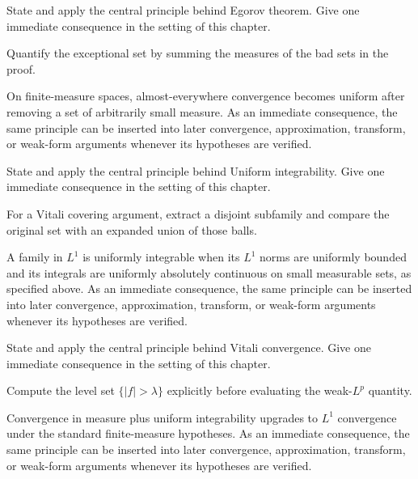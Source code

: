 \begin{exercise}\label{exr:iii08-02}
State and apply the central principle behind Egorov theorem. Give one immediate consequence in the setting of this chapter.
\end{exercise}
\begin{hint}
Quantify the exceptional set by summing the measures of the bad sets in the proof.
\end{hint}
\begin{solution}
On finite-measure spaces, almost-everywhere convergence becomes uniform after removing a set of arbitrarily small measure. As an immediate consequence, the same principle can be inserted into later convergence, approximation, transform, or weak-form arguments whenever its hypotheses are verified.
\end{solution}

\begin{exercise}\label{exr:iii08-03}
State and apply the central principle behind Uniform integrability. Give one immediate consequence in the setting of this chapter.
\end{exercise}
\begin{hint}
For a Vitali covering argument, extract a disjoint subfamily and compare the original set with an expanded union of those balls.
\end{hint}
\begin{solution}
A family in $L^1$ is uniformly integrable when its $L^1$ norms are uniformly bounded and its integrals are uniformly absolutely continuous on small measurable sets, as specified above. As an immediate consequence, the same principle can be inserted into later convergence, approximation, transform, or weak-form arguments whenever its hypotheses are verified.
\end{solution}

\begin{exercise}\label{exr:iii08-04}
State and apply the central principle behind Vitali convergence. Give one immediate consequence in the setting of this chapter.
\end{exercise}
\begin{hint}
Compute the level set \(\{|f|>\lambda\}\) explicitly before evaluating the weak-\(L^p\) quantity.
\end{hint}
\begin{solution}
Convergence in measure plus uniform integrability upgrades to $L^1$ convergence under the standard finite-measure hypotheses. As an immediate consequence, the same principle can be inserted into later convergence, approximation, transform, or weak-form arguments whenever its hypotheses are verified.
\end{solution}

